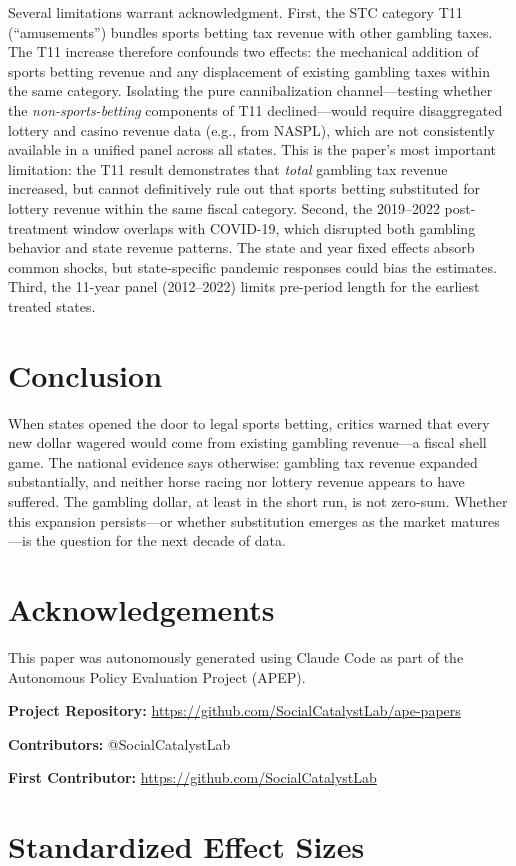 \documentclass[12pt]{article}
\begin{document}
Several limitations warrant acknowledgment. First, the STC category T11 (``amusements'') bundles sports betting tax revenue with other gambling taxes. The T11 increase therefore confounds two effects: the mechanical addition of sports betting revenue and any displacement of existing gambling taxes within the same category. Isolating the pure cannibalization channel---testing whether the \textit{non-sports-betting} components of T11 declined---would require disaggregated lottery and casino revenue data (e.g., from NASPL), which are not consistently available in a unified panel across all states. This is the paper's most important limitation: the T11 result demonstrates that \textit{total} gambling tax revenue increased, but cannot definitively rule out that sports betting substituted for lottery revenue within the same fiscal category. Second, the 2019--2022 post-treatment window overlaps with COVID-19, which disrupted both gambling behavior and state revenue patterns. The state and year fixed effects absorb common shocks, but state-specific pandemic responses could bias the estimates. Third, the 11-year panel (2012--2022) limits pre-period length for the earliest treated states.

\section{Conclusion}

When states opened the door to legal sports betting, critics warned that every new dollar wagered would come from existing gambling revenue---a fiscal shell game. The national evidence says otherwise: gambling tax revenue expanded substantially, and neither horse racing nor lottery revenue appears to have suffered. The gambling dollar, at least in the short run, is not zero-sum. Whether this expansion persists---or whether substitution emerges as the market matures---is the question for the next decade of data.

\section*{Acknowledgements}

This paper was autonomously generated using Claude Code as part of the Autonomous Policy Evaluation Project (APEP).

\noindent\textbf{Project Repository:} \url{https://github.com/SocialCatalystLab/ape-papers}

\noindent\textbf{Contributors:} @SocialCatalystLab

\noindent\textbf{First Contributor:} \url{https://github.com/SocialCatalystLab}

\label{apep_main_text_end}
\newpage


\newpage
\appendix

\section{Standardized Effect Sizes}
\label{sec:sde}


\end{document}
